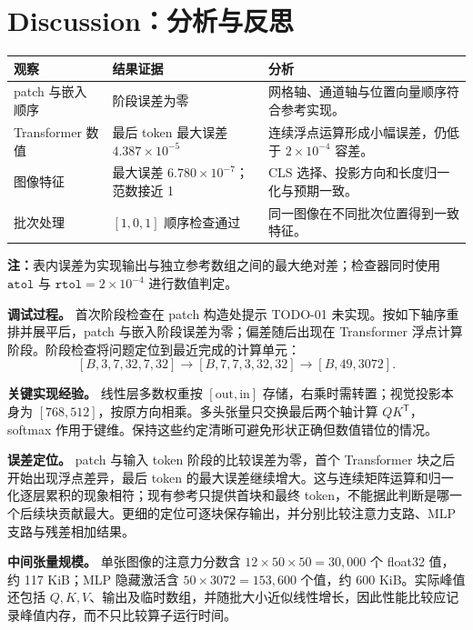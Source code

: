 \documentclass[a4paper,12pt]{article}
\begin{document}
\newpage
\section{Discussion：分析与反思}
\begin{center}
\small
\begin{tabular}{p{2.6cm}p{5.4cm}p{5.1cm}}
\toprule
观察 & 结果证据 & 分析 \\
\midrule
patch 与嵌入顺序 & 阶段误差为零 & 网格轴、通道轴与位置向量顺序符合参考实现。 \\
Transformer 数值 & 最后 token 最大误差 $4.387\times10^{-5}$ & 连续浮点运算形成小幅误差，仍低于 $2\times10^{-4}$ 容差。 \\
图像特征 & 最大误差 $6.780\times10^{-7}$；范数接近 1 & CLS 选择、投影方向和长度归一化与预期一致。 \\
批次处理 & $[1,0,1]$ 顺序检查通过 & 同一图像在不同批次位置得到一致特征。 \\
\bottomrule
\end{tabular}
\end{center}
\vspace{-0.15cm}
{\footnotesize\noindent\textbf{注：}表内误差为实现输出与独立参考数组之间的最大绝对差；检查器同时使用 $\texttt{atol}$ 与 $\texttt{rtol}=2\times10^{-4}$ 进行数值判定。\par}

\textbf{调试过程。} 首次阶段检查在 patch 构造处提示 TODO-01 未实现。按如下轴序重排并展平后，patch 与嵌入阶段误差为零；偏差随后出现在 Transformer 浮点计算阶段。阶段检查将问题定位到最近完成的计算单元：
\[
[B,3,7,32,7,32]\longrightarrow[B,7,7,3,32,32]\longrightarrow[B,49,3072].
\]

\textbf{关键实现经验。} 线性层多数权重按 $[\mathrm{out},\mathrm{in}]$ 存储，右乘时需转置；视觉投影本身为 $[768,512]$，按原方向相乘。多头张量只交换最后两个轴计算 $QK^\mathsf{T}$，softmax 作用于键维。保持这些约定清晰可避免形状正确但数值错位的情况。

\textbf{误差定位。} patch 与输入 token 阶段的比较误差为零，首个 Transformer 块之后开始出现浮点差异，最后 token 的最大误差继续增大。这与连续矩阵运算和归一化逐层累积的现象相符；现有参考只提供首块和最终 token，不能据此判断是哪一个后续块贡献最大。更细的定位可逐块保存输出，并分别比较注意力支路、MLP 支路与残差相加结果。

\textbf{中间张量规模。} 单张图像的注意力分数含 $12\times50\times50=30{,}000$ 个 float32 值，约 117 KiB；MLP 隐藏激活含 $50\times3072=153{,}600$ 个值，约 600 KiB。实际峰值还包括 $Q,K,V$、输出及临时数组，并随批大小近似线性增长，因此性能比较应记录峰值内存，而不只比较算子运行时间。
\end{document}
